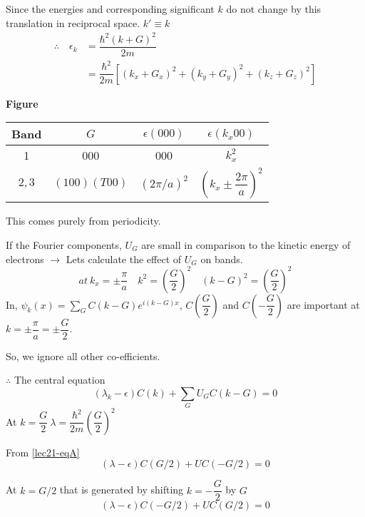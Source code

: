 Since the energies and corresponding significant $k$ do not change by this translation in reciprocal space. $k'\equiv k$
\begin{align*}
\therefore\quad \epsilon_{k} &= \dfrac{\hbar^{2}(k+G)^{2}}{2m}\\
&= \dfrac{\hbar^{2}}{2m}\left[(k_{x}+G_{x})^{2}+(k_{y}+G_{y})^{2}+(k_{z}+G_{z})^{2}\right]
\end{align*}
\begin{center}
{\bf Figure}
\end{center}
\begin{center}
\begin{tabular}{cccc}
\hline
{\bf Band} & {\boldmath$G$} & {\boldmath$\epsilon(000)$} & {\boldmath$\epsilon(k_{x}00)$}\\
\hline
1 & 000 & 000 & $k^{2}_{x}$\\
$2,3$ & $(100)(T00)$ & $(2\pi/a)^{2}$ & $\left(k_{x}\pm \dfrac{2\pi}{a}\right)^{2}$\\
\hline
\end{tabular}
\end{center}
This comes purely from periodicity.

If the Fourier components, $U_{G}$ are small in comparison to the kinetic energy of electrons $\to$ Lets calculate the effect of $U_{G}$ on bands.
$$
at \ k_{x}=\pm \dfrac{\pi}{a}\quad k^{2}=\left(\dfrac{G}{2}\right)^{2}\quad (k-G)^{2}=\left(\dfrac{G}{2}\right)^{2}
$$
In, $\psi_{k}(x)=\sum\limits_{G}C(k-G)e^{i(k-G)x}$, $C\left(\dfrac{G}{2}\right)$ and $C\left(-\dfrac{G}{2}\right)$ are important at $k=\pm \dfrac{\pi}{a}=\pm \dfrac{G}{2}$.

So, we ignore all other co-efficients.

$\therefore$ The central equation 
\begin{equation*}
(\lambda_{k}-\epsilon)C(k)+\sum\limits_{G}U_{G}C(k-G)=0\tag{A}\label{lec21-eqA}
\end{equation*}
At $k=\dfrac{G}{2} \ \lambda = \dfrac{\hbar^{2}}{2m}\left(\dfrac{G}{2}\right)^{2}$

From \eqref{lec21-eqA}
\begin{equation*}
(\lambda-\epsilon)C(G/2)+UC(-G/2)=0\tag{1}\label{lec21-eq1}
\end{equation*}

At $k=G/2$ that is generated by shifting $k=-\dfrac{G}{2}$ by $G$
\begin{equation*}
(\lambda-\epsilon)C(-G/2)+UC(G/2)=0\tag{2}\label{lec21-eq2}
\end{equation*}

